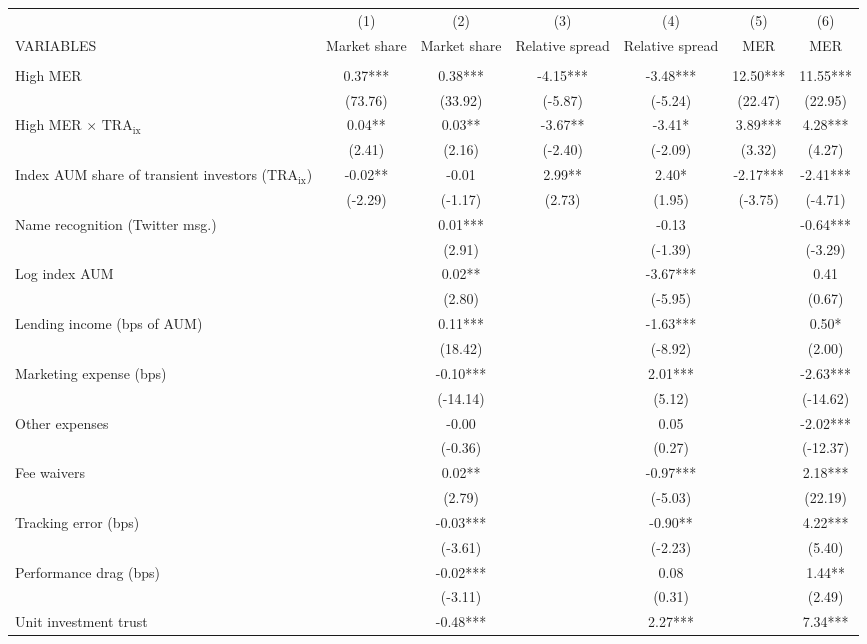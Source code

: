 \documentclass[]{article}
\begin{document}
\begin{tabular}{lcccccc} \hline
 & (1) & (2) & (3) & (4) & (5) & (6) \\
VARIABLES & Market share & Market share & Relative spread & Relative spread & MER & MER \\ \hline
 &  &  &  &  &  &  \\
High MER & 0.37*** & 0.38*** & -4.15*** & -3.48*** & 12.50*** & 11.55*** \\
 & (73.76) & (33.92) & (-5.87) & (-5.24) & (22.47) & (22.95) \\
High MER $\times$ $\text{TRA}_\text{ix}$ & 0.04** & 0.03** & -3.67** & -3.41* & 3.89*** & 4.28*** \\
 & (2.41) & (2.16) & (-2.40) & (-2.09) & (3.32) & (4.27) \\
Index AUM share of transient investors ($\text{TRA}_\text{ix}$) & -0.02** & -0.01 & 2.99** & 2.40* & -2.17*** & -2.41*** \\
 & (-2.29) & (-1.17) & (2.73) & (1.95) & (-3.75) & (-4.71) \\
Name recognition (Twitter msg.) &  & 0.01*** &  & -0.13 &  & -0.64*** \\
 &  & (2.91) &  & (-1.39) &  & (-3.29) \\
Log index AUM &  & 0.02** &  & -3.67*** &  & 0.41 \\
 &  & (2.80) &  & (-5.95) &  & (0.67) \\
Lending income (bps of AUM) &  & 0.11*** &  & -1.63*** &  & 0.50* \\
 &  & (18.42) &  & (-8.92) &  & (2.00) \\
Marketing expense (bps) &  & -0.10*** &  & 2.01*** &  & -2.63*** \\
 &  & (-14.14) &  & (5.12) &  & (-14.62) \\
Other expenses &  & -0.00 &  & 0.05 &  & -2.02*** \\
 &  & (-0.36) &  & (0.27) &  & (-12.37) \\
Fee waivers &  & 0.02** &  & -0.97*** &  & 2.18*** \\
 &  & (2.79) &  & (-5.03) &  & (22.19) \\
Tracking error (bps) &  & -0.03*** &  & -0.90** &  & 4.22*** \\
 &  & (-3.61) &  & (-2.23) &  & (5.40) \\
Performance drag (bps) &  & -0.02*** &  & 0.08 &  & 1.44** \\
 &  & (-3.11) &  & (0.31) &  & (2.49) \\
Unit investment trust &  & -0.48*** &  & 2.27*** &  & 7.34*** \\

\end{tabular}
\end{document}
